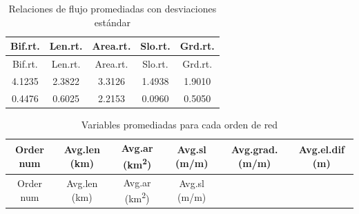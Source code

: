 \documentclass[11pt,]{article}
\begin{document}
\begin{longtable}[]{@{}ccccc@{}}
\caption{\label{estandard} Relaciones de flujo promediadas con
desviaciones estándar}\tabularnewline
\toprule
Bif.rt. & Len.rt. & Area.rt. & Slo.rt. & Grd.rt.\tabularnewline
\midrule
\endfirsthead
\toprule
Bif.rt. & Len.rt. & Area.rt. & Slo.rt. & Grd.rt.\tabularnewline
\midrule
\endhead
4.1235 & 2.3822 & 3.3126 & 1.4938 & 1.9010\tabularnewline
0.4476 & 0.6025 & 2.2153 & 0.0960 & 0.5050\tabularnewline
\bottomrule
\end{longtable}

\begin{longtable}[]{@{}cccccc@{}}
\caption{\label{promo} Variables promediadas para cada orden de
red}\tabularnewline
\toprule
\begin{minipage}[b]{0.08\columnwidth}\centering\strut
Order num\strut
\end{minipage} & \begin{minipage}[b]{0.11\columnwidth}\centering\strut
Avg.len (km)\strut
\end{minipage} & \begin{minipage}[b]{0.25\columnwidth}\centering\strut
Avg.ar (km\textsuperscript{2})\strut
\end{minipage} & \begin{minipage}[b]{0.11\columnwidth}\centering\strut
Avg.sl (m/m)\strut
\end{minipage} & \begin{minipage}[b]{0.14\columnwidth}\centering\strut
Avg.grad. (m/m)\strut
\end{minipage} & \begin{minipage}[b]{0.13\columnwidth}\centering\strut
Avg.el.dif (m)\strut
\end{minipage}\tabularnewline
\midrule
\endfirsthead
\toprule
\begin{minipage}[b]{0.08\columnwidth}\centering\strut
Order num\strut
\end{minipage} & \begin{minipage}[b]{0.11\columnwidth}\centering\strut
Avg.len (km)\strut
\end{minipage} & \begin{minipage}[b]{0.25\columnwidth}\centering\strut
Avg.ar (km\textsuperscript{2})\strut
\end{minipage} & \begin{minipage}[b]{0.11\columnwidth}\centering\strut
Avg.sl (m/m)\strut
\end{minipage} & \begin{minipage}[b]{0.14\columnwidth}\centering\strut

\end{minipage}
\end{longtable}
\end{document}
